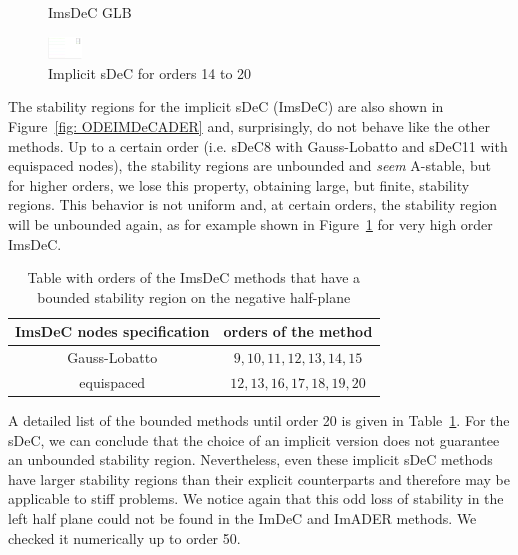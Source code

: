 \begin{figure}
\begin{minipage}[t]{0.45\textwidth}
		ImsDeC GLB
	\end{minipage}
	\includegraphics[width=0.08\textwidth, trim={491 180 30 23}, clip]{pdf/odepics/colors_a-d_new_14-20_no_order.pdf}
	\caption{Implicit sDeC for orders 14 to 20}
	\label{fig: exaImsDeC_high}
\end{figure}
The stability regions for the implicit sDeC (ImsDeC) are also shown in Figure~\ref{fig: ODEIMDeCADER} and, surprisingly, do not behave like the other methods. 
Up to a certain order (i.e. sDeC8 with Gauss-Lobatto and sDeC11 with equispaced nodes), the stability regions are unbounded and \textit{seem} A-stable, but for higher orders, we lose this property, obtaining large, but finite, stability regions. 
This behavior is not uniform and, at certain orders, the stability region will be unbounded again, as for example shown in Figure~\ref{fig: exaImsDeC_high} for very high order ImsDeC. 


\begin{table}
	\centering
	\caption{Table with orders of the ImsDeC methods that have a bounded stability region on the negative half-plane}
	\label{tab:imsDeC_bounded}
	\begin{tabular}[h]{|c|c|}
		\hline
		ImsDeC nodes specification & orders of the method\\
		\hline
		Gauss-Lobatto & $9, 10, 11, 12, 13, 14, 15 $\\
		\hline	equispaced & $12, 13, 16, 17, 18, 19, 20 $\\
		\hline
	\end{tabular}
\end{table}
A detailed list of the bounded methods until order 20 is given in Table~\ref{tab:imsDeC_bounded}. 
For the sDeC, we can conclude that the choice of an implicit version does not guarantee an unbounded stability region. Nevertheless, even these implicit sDeC methods have larger stability regions than their explicit counterparts and therefore may be applicable to stiff problems. 
We notice again that this odd loss of stability in the left half plane could not be found in the ImDeC and ImADER methods. We checked it numerically up to order 50.




